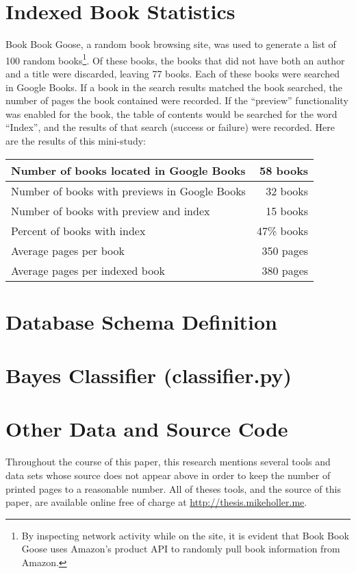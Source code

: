 \newpage \appendix \appendixpage \addappheadtotoc
\section{Indexed Book Statistics}
\label{appendix:d}

Book Book Goose\cite{book-book-goose}, a random book browsing site, was used to generate a list of 100 random books\footnote{By inspecting network activity while on the site, it is evident that Book Book Goose uses Amazon's product API\cite{amazon-products} to randomly pull book information from Amazon.}.
Of these books, the books that did not have both an author and a title were discarded, leaving 77 books.
Each of these books were searched in Google Books\cite{google-books}.
If a book in the search results matched the book searched, the number of pages the book contained were recorded.
If the ``preview'' functionality was enabled for the book, the table of contents would be searched for the word ``Index'', and the results of that search (success or failure) were recorded.
Here are the results of this mini-study:

\begin{center}
\begin{tabular}{|l|r|}
\hline 
Number of books located in Google Books & 58 books \\ 
\hline 
Number of books with previews in Google Books & 32 books \\ 
\hline 
Number of books with preview and index & 15 books \\ 
\hline 
Percent of books with index & 47\% books \\ 
\hline
Average pages per book & 350 pages \\ 
\hline 
Average pages per indexed book & 380 pages \\ 
\hline 
\end{tabular}
\end{center}


\section{Database Schema Definition}
\label{appendix:a}


\section{\Naive Bayes Classifier (classifier.py)}
\label{appendix:b}


\section{Other Data and Source Code}
\label{appendix:c}

Throughout the course of this paper, this research mentions several tools and data sets whose source does not appear above in order to keep the number of printed pages to a reasonable number.
All of theses tools, and the source of this paper, are available online free of charge at \url{http://thesis.mikeholler.me}.